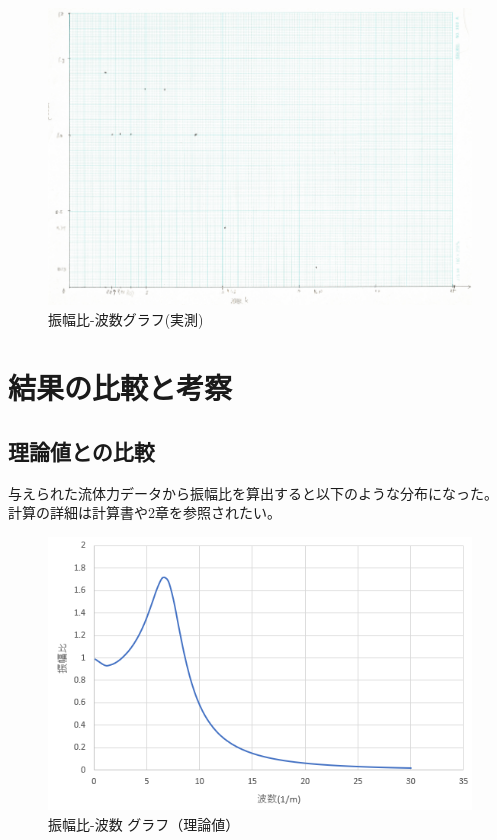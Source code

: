 \documentclass[dvipdfmx,a4paper]{jreport} %
\begin{document}
\begin{figure}[H]
    \centering
    \includegraphics[width=0.9\linewidth]{summer/ship-experiment/2d-pool/pictures/graph01.png}
    \caption{振幅比-波数グラフ(実測)}
    \label{fig:graph01}
\end{figure}


\chapter{結果の比較と考察}
\section{理論値との比較}
与えられた流体力データから振幅比を算出すると以下のような分布になった。
計算の詳細は計算書や2章を参照されたい。

\begin{figure}[H]
    \centering
    \includegraphics[width=0.9\linewidth]{summer/ship-experiment/2d-pool/pictures/shinpukuhi.png}
    \caption{振幅比-波数 グラフ（理論値）}
    \label{fig:shinpukuhi}
\end{figure}
\end{document}
